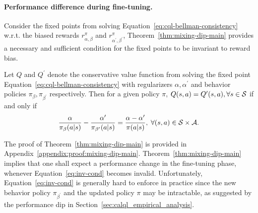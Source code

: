 \paragraph{Performance difference during fine-tuning.} 
Consider the fixed points from solving Equation~\ref{eq:cql-bellman-consistency} w.r.t. the biased rewards $r^\pi_{\alpha,\beta}$ and $r^\pi_{\alpha^\prime,\beta^\prime}$, Theorem~\ref{thm:mixing-dip-main} provides a necessary and sufficient condition for the fixed points to be invariant to reward bias.
\begin{theorem}
\label{thm:mixing-dip-main}
Let $Q$ and $Q^\prime$ denote the conservative value function from solving the fixed point Equation~\ref{eq:cql-bellman-consistency}
with regularizers $\alpha,\alpha^\prime$ and behavior policies $\pi_\beta,\pi_{\beta^\prime}$ respectively. Then for a given policy $\pi$, $Q(s,a) = Q^\prime(s,a),\forall s\in \mathcal S$ if and only if
\begin{equation}
    \label{eq:inv-cond}
    \footnotesize{
    \frac{\alpha}{\pi_\beta(a|s)}-\frac{\alpha^\prime}{\pi_{\beta^\prime}(a|s)}=\frac{\alpha-\alpha^\prime}{\pi(a|s)},\;\forall (s,a)\in \mc S\times \mc A.}
\end{equation}
\end{theorem}
The proof of Theorem~\ref{thm:mixing-dip-main} is provided in Appendix~\ref{appendix:proof:mixing-dip-main}. Theorem~\ref{thm:mixing-dip-main} implies that one shall expect a performance change in the fine-tuning phase, whenever Equation~\ref{eq:inv-cond} becomes invalid. Unfortunately, Equation~\ref{eq:inv-cond} is generally hard to enforce in practice since the new behavior policy $\pi_{\beta^\prime}$ and the updated policy $\pi$ may be intractable, as suggested by the performance dip in Section~\ref{sec:calql_empirical_analysis}.

